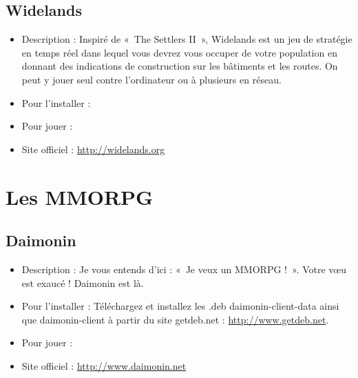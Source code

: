 \subsection{Widelands}
\begin{itemize}
\begingroup
{}
\item Description : Inspiré de «~The Settlers II~», Widelands est un jeu de stratégie en temps réel dans lequel vous devrez vous occuper de votre population en donnant des indications de construction sur les bâtiments et les routes. On peut y jouer seul contre l'ordinateur ou à plusieurs en réseau.{\par}
\item Pour l'installer : 
\item Pour jouer : 
\item Site officiel : \url{http://widelands.org}{\par}
\endgroup
\end{itemize}
\section{Les MMORPG}
\subsection{Daimonin}
\begin{itemize}
\begingroup
{}
\item Description : Je vous entends d'ici : «~Je veux un MMORPG !~». Votre vœu est exaucé ! Daimonin est là.{\par}
\item Pour l'installer : Téléchargez et installez les .deb daimonin-client-data ainsi que daimonin-client à partir du site getdeb.net : \url{http://www.getdeb.net}.{\par}
\endgroup
\item Pour jouer : 
\item Site officiel : \url{http://www.daimonin.net}{\par}
\end{itemize}
